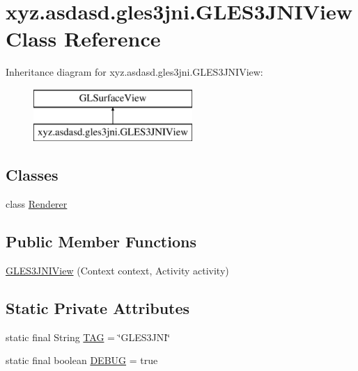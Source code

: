 \hypertarget{classxyz_1_1asdasd_1_1gles3jni_1_1_g_l_e_s3_j_n_i_view}{}\section{xyz.\+asdasd.\+gles3jni.\+G\+L\+E\+S3\+J\+N\+I\+View Class Reference}
\label{classxyz_1_1asdasd_1_1gles3jni_1_1_g_l_e_s3_j_n_i_view}
Inheritance diagram for xyz.\+asdasd.\+gles3jni.\+G\+L\+E\+S3\+J\+N\+I\+View\+:\begin{figure}[H]
\begin{center}
\leavevmode
\includegraphics[height=2.000000cm]{df/dbf/classxyz_1_1asdasd_1_1gles3jni_1_1_g_l_e_s3_j_n_i_view}
\end{center}
\end{figure}
\subsection*{Classes}
\begin{DoxyCompactItemize}
\item 
class \hyperlink{classxyz_1_1asdasd_1_1gles3jni_1_1_g_l_e_s3_j_n_i_view_1_1_renderer}{Renderer}
\end{DoxyCompactItemize}
\subsection*{Public Member Functions}
\begin{DoxyCompactItemize}
\item 
\hyperlink{classxyz_1_1asdasd_1_1gles3jni_1_1_g_l_e_s3_j_n_i_view_ab9ce5c0dde77761ae08c4923b46f82cd}{G\+L\+E\+S3\+J\+N\+I\+View} (Context context, Activity activity)
\end{DoxyCompactItemize}
\subsection*{Static Private Attributes}
\begin{DoxyCompactItemize}
\item 
static final String \hyperlink{classxyz_1_1asdasd_1_1gles3jni_1_1_g_l_e_s3_j_n_i_view_ac2d92c5f042ecccc1a703a09b99662d0}{T\+AG} = \char`\"{}G\+L\+E\+S3\+J\+NI\char`\"{}
\item 
static final boolean \hyperlink{classxyz_1_1asdasd_1_1gles3jni_1_1_g_l_e_s3_j_n_i_view_a674e777e7d25b14f97bd6731977e7cce}{D\+E\+B\+UG} = true
\end{DoxyCompactItemize}


